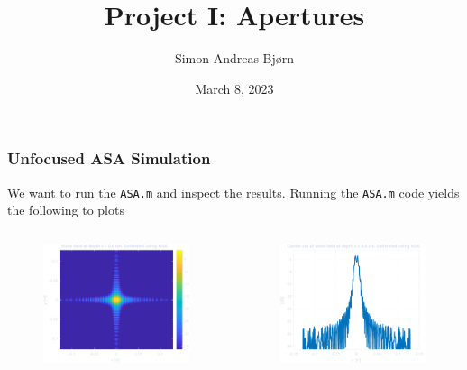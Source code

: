 \documentclass[compress]{beamer}
\title{Project I: Apertures}
\subtitle{}
\author{\Large Simon Andreas Bjørn}
\date{\large March 8, 2023}
\begin{document}
\begin{frame}
    \maketitle
\end{frame}

\begin{frame} %
    \frametitle{Unfocused ASA Simulation}
    We want to run the \texttt{ASA.m} and inspect the results.
    Running the \texttt{ASA.m} code yields the following to plots
    \begin{columns}
        \begin{column}{0.5\textwidth}
            \begin{figure}
                \includegraphics[height=0.5\textheight]{"../1a.pdf"}
            \end{figure}
        \end{column}
        \begin{column}{0.5\textwidth}
            \begin{figure}
                \includegraphics[height=0.5\textheight]{"../1b.pdf"}

\end{figure}
\end{column}
\end{columns}
\end{frame}
\end{document}
